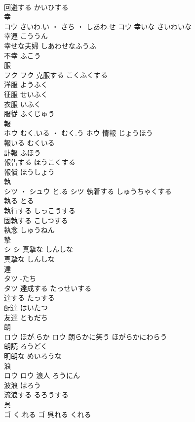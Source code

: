 \documentclass[8pt]{extreport}
\begin{document}
\begin{CJK}{UTF8}{min}
\\	回避する	かいひする	
\\	幸	
\\	コウ	さいわ.い ・ さち ・ しあわ.せ	コウ	幸いな	さいわいな	
\\	幸運	こううん	
\\	幸せな夫婦	しあわせなふうふ	
\\	不幸	ふこう	
\\	服	
\\	フク		フク	克服する	こくふくする	
\\	洋服	ようふく	
\\	征服	せいふく	
\\	衣服	いふく	
\\	服従	ふくじゅう	
\\	報	
\\	ホウ	むく.いる ・ むく.う	ホウ	情報	じょうほう	
\\	報いる	むくいる	
\\	訃報	ふほう	
\\	報告する	ほうこくする	
\\	報償	ほうしょう	
\\	執	
\\	シツ ・ シュウ	と.る	シツ	執着する	しゅうちゃくする	
\\	執る	とる	
\\	執行する	しっこうする	
\\	固執する	こしつする	
\\	執念	しゅうねん	
\\	摯	
\\	シ		シ	真摯な	しんしな	
\\	真摯な	しんしな	
\\	達	
\\	タツ	-たち
\\	タツ	達成する	たっせいする	
\\	達する	たっする	
\\	配達	はいたつ	
\\	友達	ともだち	
\\	朗	
\\	ロウ	ほが.らか	ロウ	朗らかに笑う	ほがらかにわらう	
\\	朗読	ろうどく	
\\	明朗な	めいろうな	
\\	浪	
\\	ロウ		ロウ	浪人	ろうにん	
\\	波浪	はろう	
\\	流浪する	るろうする	
\\	呉	
\\	ゴ	く.れる	ゴ	呉れる	くれる	

\end{CJK}
\end{document}
